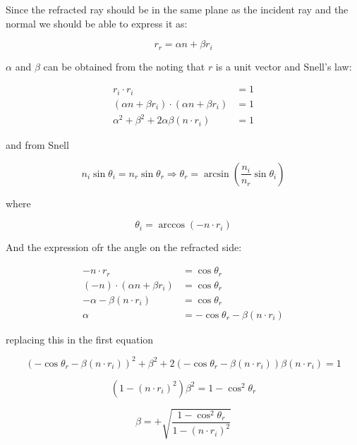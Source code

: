 \documentclass[10pt,a4paper]{article}
\begin{document}
Since the refracted ray should be in the same plane as the incident ray and the normal we should be able to express it as:

\[
r_r = \alpha  n + \beta r_i
\]

$\alpha$ and $\beta$ can be obtained from the noting that $r$ is a unit vector 
and Snell's law:

\begin{align*}
r_i \cdot r_i                                         & = 1 \\
(\alpha  n + \beta r_i) \cdot (\alpha  n + \beta r_i) & = 1 \\
\alpha^2 + \beta^2 + 2 \alpha \beta (n \cdot r_i)     & = 1 
\end{align*}


and from Snell

\[
n_i \sin{\theta_i} = n_r \sin{\theta_r}
\Rightarrow
\theta_r = \arcsin{ \left( \dfrac{n_i}{n_r}\sin{\theta_i} \right) }
\]

where

\[
\theta_i = \arccos{\left( -n \cdot r_i \right)}
\]

And the expression ofr the angle on the refracted side:

\begin{align*}
-n \cdot r_r                     & = \cos\theta_r  \\
(-n)\cdot (\alpha n +\beta r_i)  & = \cos\theta_r  \\
-\alpha-\beta (n\cdot r_i)       & = \cos\theta_r  \\
\alpha                           & = -\cos\theta_r -\beta(n \cdot r_i) 
\end{align*}


replacing this in the first equation

\[
(- \cos\theta_r - \beta (n \cdot r_i))^2+ \beta^2 +2(-\cos\theta_r-\beta(n\cdot r_i))\beta(n\cdot r_i)=1
\]

\[
(1-(n\cdot r_i)^2)\beta^2 = 1-\cos^2\theta_r
\]

\[
\beta = + \sqrt{\dfrac{1-\cos^2\theta_r}{1-(n \cdot r_i)^2}}
\]
\end{document}
